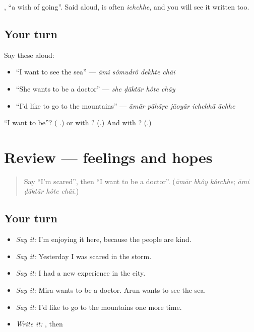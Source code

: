 \textbf{ }, \textquotedblleft{}a wish of going\textquotedblright{}. Said aloud, \textbf{} is often \emph{ichchhe}, and you will see it written \textbf{} too.

\subsection*{Your turn}
Say these aloud:

\begin{itemize}
\raggedright
  \item \textquotedblleft{}I want to see the sea\textquotedblright{} — \emph{āmi sômudrô dekhte chāi}
  \item \textquotedblleft{}She wants to be a doctor\textquotedblright{} — \emph{she ḍāktār hôte chāy}
  \item \textquotedblleft{}I'd like to go to the mountains\textquotedblright{} — \emph{āmār pāhāṛe jāoyār ichchhā āchhe}
\end{itemize}

\begin{tcolorbox}[breakable,colback=teal!4,colframe=teal!35!black,title={Before you move on}]
\textquotedblleft{}I want to be\textquotedblright{}? (\textbf{ }.) \textbf{} or \textbf{} with \textbf{}? (\textbf{}.) And with \textbf{ }? (\textbf{}.)
\end{tcolorbox}
\section[(review)]{Review — feelings and hopes}

\label{lesson:BN-R272-feelings-and-hopes}



\begin{quote}
Say \textquotedblleft{}I'm scared\textquotedblright{}, then \textquotedblleft{}I want to be a doctor\textquotedblright{}. (\emph{āmār bhôy kôrchhe}; \emph{āmi ḍāktār hôte chāi}.)
\end{quote}

\subsection*{Your turn}
\begin{itemize}
\raggedright
  \item \emph{Say it:} I'm enjoying it here, because the people are kind.
  \item \emph{Say it:} Yesterday I was scared in the storm.
  \item \emph{Say it:} I had a new experience in the city.
  \item \emph{Say it:} Mira wants to be a doctor. Arun wants to see the sea.
  \item \emph{Say it:} I'd like to go to the mountains one more time.
  \item \emph{Write it:} \textbf{}, then \textbf{}
\end{itemize}

